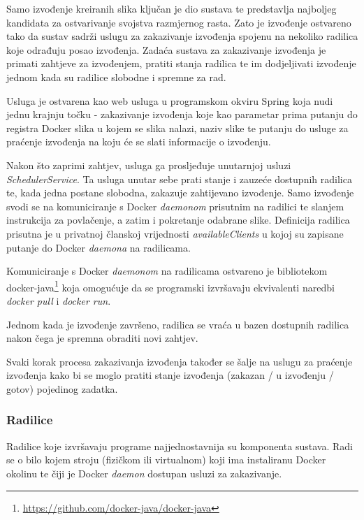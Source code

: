 \documentclass[times, utf8, zavrsni]{fer}
\begin{document}
{Samo izvođenje kreiranih slika ključan je dio sustava te predstavlja najboljeg kandidata za ostvarivanje svojstva razmjernog rasta. Zato je izvođenje ostvareno tako da sustav sadrži uslugu za zakazivanje izvođenja spojenu na nekoliko radilica koje odrađuju posao izvođenja. Zadaća sustava za zakazivanje izvođenja je primati zahtjeve za izvođenjem, pratiti stanja radilica te im dodjeljivati izvođenje jednom kada su radilice slobodne i spremne za rad.

Usluga je ostvarena kao web usluga u programskom okviru Spring koja nudi jednu krajnju točku - zakazivanje izvođenja koje kao parametar prima putanju do registra Docker slika u kojem se slika nalazi, naziv slike te putanju do usluge za praćenje izvođenja na koju će se slati informacije o izvođenju.

Nakon što zaprimi zahtjev, usluga ga prosljeđuje unutarnjoj usluzi {\textit{SchedulerService}}. Ta usluga unutar sebe prati stanje i zauzeće dostupnih radilica te, kada jedna postane slobodna, zakazuje zahtijevano izvođenje. Samo izvođenje svodi se na komuniciranje s Docker {\textit{daemonom}} prisutnim na radilici te slanjem instrukcija za povlačenje, a zatim i pokretanje odabrane slike. Definicija radilica prisutna je u privatnoj članskoj vrijednosti {\textit{availableClients}} u kojoj su zapisane putanje do Docker {\textit{daemona}} na radilicama.

Komuniciranje s Docker {\textit{daemonom}} na radilicama ostvareno je bibliotekom docker-java{\footnote{\url{https://github.com/docker-java/docker-java}}} koja omogućuje da se programski izvršavaju ekvivalenti naredbi {\textit{docker pull}} i {\textit{docker run}}.

Jednom kada je izvođenje završeno, radilica se vraća u bazen dostupnih radilica nakon čega je spremna obraditi novi zahtjev.

Svaki korak procesa zakazivanja izvođenja također se šalje na uslugu za praćenje izvođenja kako bi se moglo pratiti stanje izvođenja (zakazan / u izvođenju / gotov) pojedinog zadatka.

\subsubsection{Radilice}

Radilice koje izvršavaju programe najjednostavnija su komponenta sustava. Radi se o bilo kojem stroju (fizičkom ili virtualnom) koji ima instaliranu Docker okolinu te čiji je Docker {\textit{daemon}} dostupan usluzi za zakazivanje.

}
\end{document}
